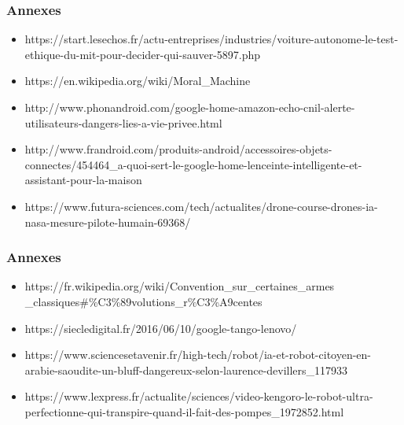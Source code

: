 \documentclass{beamer}
\begin{document}
	\begin{frame}[fragile]
	\frametitle{Annexes}
	\begin{itemize}
	\itemsep1em
		\item https://start.lesechos.fr/actu-entreprises/industries/voiture-autonome-le-test-ethique-du-mit-pour-decider-qui-sauver-5897.php
		\item https://en.wikipedia.org/wiki/Moral\_Machine
		\item http://www.phonandroid.com/google-home-amazon-echo-cnil-alerte-utilisateurs-dangers-lies-a-vie-privee.html
		\item http://www.frandroid.com/produits-android/accessoires-objets-connectes/454464\_a-quoi-sert-le-google-home-lenceinte-intelligente-et-assistant-pour-la-maison
		\item https://www.futura-sciences.com/tech/actualites/drone-course-drones-ia-nasa-mesure-pilote-humain-69368/
	\end{itemize}
	\end{frame}
	
		\begin{frame}[fragile]
	\frametitle{Annexes}
	\begin{itemize}
	\itemsep1em
		\item https://fr.wikipedia.org/wiki/Convention\_sur\_certaines\_armes\\
		\_classiques\#\%C3\%89volutions\_r\%C3\%A9centes
		\item https://siecledigital.fr/2016/06/10/google-tango-lenovo/
		\item https://www.sciencesetavenir.fr/high-tech/robot/ia-et-robot-citoyen-en-arabie-saoudite-un-bluff-dangereux-selon-laurence-devillers\_117933
		\item https://www.lexpress.fr/actualite/sciences/video-kengoro-le-robot-ultra-perfectionne-qui-transpire-quand-il-fait-des-pompes\_1972852.html
	\end{itemize}
	\end{frame}
	
\end{document}
